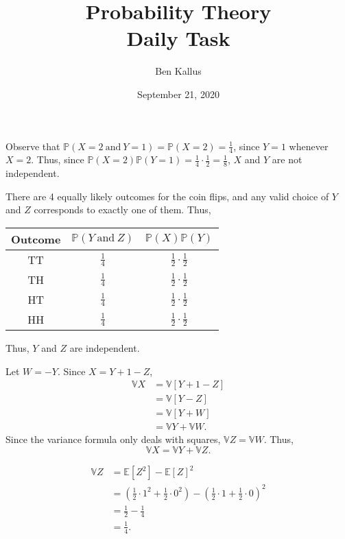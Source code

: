 \documentclass[12pt]{article}
\title{Probability Theory \\ Daily Task}
\author{Ben Kallus}
\date{September 21, 2020}
\begin{document}
\maketitle


    Observe that $\mathbb P(X = 2~\text{and}~Y=1) = \mathbb P(X=2) = \frac14$, since $Y=1$ whenever $X=2$. Thus, since $\mathbb P(X=2)\mathbb P(Y=1) = \frac14 \cdot \frac12 = \frac18$, $X$ and $Y$ are not independent.

\bigskip
{}

    There are 4 equally likely outcomes for the coin flips, and any valid choice of $Y$ and $Z$ corresponds to exactly one of them. Thus,

    \begin{tabular}{| c | c | c |}
        \hline
        Outcome & $\mathbb P(Y~\text{and}~Z)$ & $\mathbb P(X) \mathbb P(Y)$ \\
        \hline
        TT & $\frac14$ & $\frac12 \cdot \frac12$ \\
        TH & $\frac14$ & $\frac12 \cdot \frac12$ \\
        HT & $\frac14$ & $\frac12 \cdot \frac12$ \\
        HH & $\frac14$ & $\frac12 \cdot \frac12$ \\
        \hline
    \end{tabular}
    
    Thus, $Y$ and $Z$ are independent.
    
\bigskip
{}
    
    Let $W = -Y$. Since $X=Y+1-Z$, 
    \begin{align*}
        \mathbb VX &= \mathbb V[Y+1-Z] \\
                   &= \mathbb V[Y-Z] \\
                   &= \mathbb V[Y+ W] \\
                   &= \mathbb VY + \mathbb VW.
    \end{align*}
    Since the variance formula only deals with squares, $\mathbb VZ = \mathbb VW$. Thus, $$\mathbb VX = \mathbb VY + \mathbb VZ.$$

\newpage
{}
    \begin{align*}
        \mathbb VZ &= \mathbb E[Z^2] - \mathbb E[Z]^2 \\
                   &= (\frac12 \cdot 1^2 + \frac12 \cdot 0^2) - (\frac12 \cdot 1 + \frac12 \cdot 0)^2 \\
                   &= \frac12 - \frac14 \\
                   &= \frac14.
    \end{align*}
    
\end{document}

